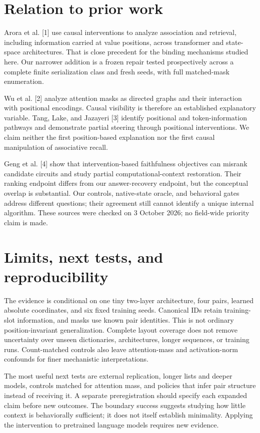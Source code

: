 \documentclass[10pt,letterpaper]{article}
\begin{document}
\section{Relation to prior work}
Arora et al. [1] use causal interventions to analyze association and retrieval, including information carried at value positions, across transformer and state-space architectures. That is close precedent for the binding mechanisms studied here. Our narrower addition is a frozen repair tested prospectively across a complete finite serialization class and fresh seeds, with full matched-mask enumeration.

Wu et al. [2] analyze attention masks as directed graphs and their interaction with positional encodings. Causal visibility is therefore an established explanatory variable. Tang, Lake, and Jazayeri [3] identify positional and token-information pathways and demonstrate partial steering through positional interventions. We claim neither the first position-based explanation nor the first causal manipulation of associative recall.

Geng et al. [4] show that intervention-based faithfulness objectives can misrank candidate circuits and study partial computational-context restoration. Their ranking endpoint differs from our answer-recovery endpoint, but the conceptual overlap is substantial. Our controls, native-state oracle, and behavioral gates address different questions; their agreement still cannot identify a unique internal algorithm. These sources were checked on 3 October 2026; no field-wide priority claim is made.

\section{Limits, next tests, and reproducibility}
The evidence is conditional on one tiny two-layer architecture, four pairs, learned absolute coordinates, and six fixed training seeds. Canonical IDs retain training-slot information, and masks use known pair identities. This is not ordinary position-invariant generalization. Complete layout coverage does not remove uncertainty over unseen dictionaries, architectures, longer sequences, or training runs. Count-matched controls also leave attention-mass and activation-norm confounds for finer mechanistic interpretations.

The most useful next tests are external replication, longer lists and deeper models, controls matched for attention mass, and policies that infer pair structure instead of receiving it. A separate preregistration should specify each expanded claim before new outcomes. The boundary success suggests studying how little context is behaviorally sufficient; it does not itself establish minimality. Applying the intervention to pretrained language models requires new evidence.
\end{document}
